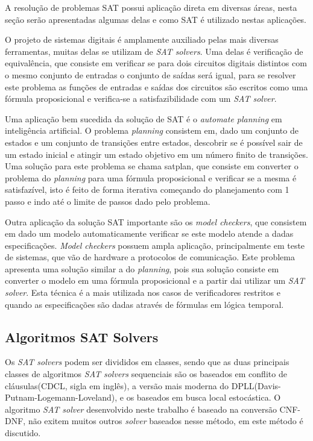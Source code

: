 \documentclass{ufsc-thesis}
\begin{document}
A resolução de problemas SAT possui aplicação direta em diversas áreas, 
nesta seção serão apresentadas algumas delas e como SAT é utilizado nestas 
aplicações.

O projeto de sistemas digitais é amplamente auxiliado pelas mais diversas 
ferramentas, muitas delas se utilizam de \textit{SAT solvers}\cite{Lavagno2006}. Uma delas é verificação 
de equivalência, que consiste em verificar se para dois circuitos digitais 
distintos com o mesmo conjunto de entradas o conjunto de saídas será igual, 
para se resolver este problema as funções de entradas e saídas dos circuitos 
são escritos como uma fórmula proposicional e verifica-se a satisfazibilidade 
com um \textit{SAT solver}.

Uma aplicação bem sucedida da solução de SAT é o \textit{automate planning} em 
inteligência artificial\cite{Kautz1992}. O problema \textit{planning} consistem em, 
dado um conjunto de estados e um conjunto de transições entre estados, 
descobrir se é possível sair de um estado inicial e atingir um estado 
objetivo em um número finito de transições. Uma solução para este problema 
se chama satplan\cite{Kautz1992}, que consiste em converter o problema do \textit{planning}
para uma fórmula proposicional e verificar se a mesma é satisfazível, isto é 
feito de forma iterativa começando do planejamento com 1 passo e indo até 
o limite de passos dado pelo problema.

Outra aplicação da solução SAT importante são os \textit{model checkers}\cite{Biere},
que consistem em dado um modelo automaticamente verificar se este modelo 
atende a dadas especificações. \textit{Model checkers} possuem ampla aplicação, 
principalmente em teste de sistemas, que vão de hardware a protocolos de comunicação.
Este problema apresenta uma solução similar a do \textit{planning}, pois sua solução 
consiste em converter o modelo em uma fórmula proposicional e a partir dai utilizar um 
\textit{SAT solver}\cite{Clarke2001}. Esta técnica é a mais utilizada nos casos de verificadores 
restritos e quando as especificações são dadas através de fórmulas em lógica 
temporal.

\subsection{Algoritmos SAT Solvers}
\label{sec:solver}

Os \textit{SAT solvers} podem ser divididos em classes, sendo que as 
duas principais classes de algoritmos \textit{SAT solvers} sequenciais 
são os baseados em conflito de cláusulas(CDCL, sigla em inglês), a 
versão mais moderna do DPLL(Davis-Putnam-Logemann-Loveland)\cite{Davis1962}, e os 
baseados em busca local estocástica\cite{Selman95}. O algoritmo \textit{SAT solver} 
desenvolvido neste trabalho é baseado na conversão CNF-DNF, 
não exitem muitos outros \textit{solver} baseados nesse método, 
em \cite{Miltersen} \cite{Katajainen} este método é discutido.
\end{document}
